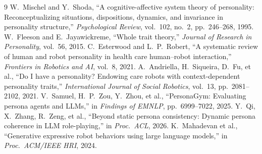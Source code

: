 \documentclass[letterpaper,10pt,conference]{ieeeconf}
\begin{document}
{\small
\begin{thebibliography}{9}
W.~Mischel and Y.~Shoda, ``A cognitive-affective system theory of personality: Reconceptualizing situations, dispositions, dynamics, and invariance in personality structure,'' \emph{Psychological Review}, vol.~102, no.~2, pp.~246--268, 1995.
W.~Fleeson and E.~Jayawickreme, ``Whole trait theory,'' \emph{Journal of Research in Personality}, vol.~56, 2015.
C.~Esterwood and L.~P.~Robert, ``A systematic review of human and robot personality in health care human--robot interaction,'' \emph{Frontiers in Robotics and AI}, vol.~8, 2021.
A.~Andriella, H.~Siqueira, D.~Fu, et al., ``Do I have a personality? Endowing care robots with context-dependent personality traits,'' \emph{International Journal of Social Robotics}, vol.~13, pp.~2081--2102, 2021.
V.~Samuel, H.~P.~Zou, Y.~Zhou, et al., ``PersonaGym: Evaluating persona agents and LLMs,'' in \emph{Findings of EMNLP}, pp.~6999--7022, 2025.
Y.~Qi, X.~Zhang, R.~Zeng, et al., ``Beyond static persona consistency: Dynamic persona coherence in LLM role-playing,'' in \emph{Proc.\ ACL}, 2026.
K.~Mahadevan et al., ``Generative expressive robot behaviors using large language models,'' in \emph{Proc.\ ACM/IEEE HRI}, 2024.
\end{thebibliography}
}
\end{document}
